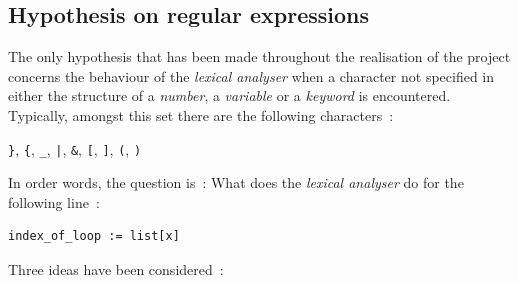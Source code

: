 \documentclass[a4paper,11pt]{article}
\begin{document}
  \subsection{Hypothesis on regular expressions}
    \label{hypothesis}
    The only hypothesis that has been made throughout the realisation of the project concerns the behaviour of the \textit{lexical analyser} when a character not specified in either the structure of a \textit{number}, a \textit{variable} or a \textit{keyword} is encountered. Typically, amongst this set there are the following characters~:
    \begin{center}
      \verb|}|, \verb|{|, \verb|_|, \verb=|=, \verb|&|, \verb|[|, \verb|]|, \verb|(|, \verb|)|
    \end{center}
    In order words, the question is~: What does the \textit{lexical analyser} do for the following line~:
    \begin{lstlisting}
index_of_loop := list[x]\end{lstlisting}
    Three ideas have been considered~:
\end{document}
